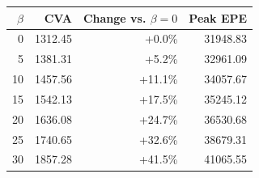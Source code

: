 \begin{tabular}{rrrr}
\toprule
$\beta$ & CVA & Change vs. $\beta=0$ & Peak EPE \\
\midrule
0 & 1312.45 & +0.0\% & 31948.83 \\
5 & 1381.31 & +5.2\% & 32961.09 \\
10 & 1457.56 & +11.1\% & 34057.67 \\
15 & 1542.13 & +17.5\% & 35245.12 \\
20 & 1636.08 & +24.7\% & 36530.68 \\
25 & 1740.65 & +32.6\% & 38679.31 \\
30 & 1857.28 & +41.5\% & 41065.55 \\
\bottomrule
\end{tabular}
